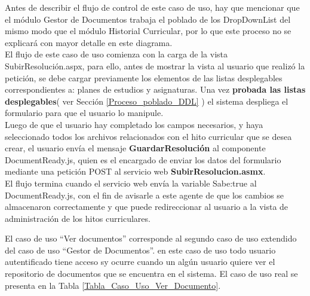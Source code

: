 	
	Antes de describir el flujo de control de este caso de uso, hay que mencionar que el módulo Gestor de Documentos trabaja el poblado de los DropDownList del mismo modo que el módulo Historial Curricular, por lo que este proceso no se explicará  con mayor detalle en este diagrama.\\
	
	El flujo de este caso de uso comienza con la carga de la vista SubirResolución.aspx, para ello, antes de mostrar la vista al usuario que realizó la petición, se debe cargar previamente los elementos de las listas  desplegables correspondientes a: planes de estudios y asignaturas. Una vez   \textbf{probada las   listas  desplegables}( ver Sección \ref{Proceso_poblado_DDL} ) el sistema despliega el formulario para que el usuario lo manipule.\\
	
	Luego de que el usuario hay completado los campos necesarios, y haya seleccionado todos los archivos relacionados con el hito curricular que se desea crear, el usuario envía el mensaje \textbf{GuardarResolución} al componente DocumentReady.js, quien es el encargado de  enviar los datos del formulario mediante una petición POST al servicio web \textbf{SubirResolucion.asmx}.\\
	
	El flujo termina cuando el servicio web envía la variable Sabe:true al DocumentReady.js, con el fin de avisarle a este agente de que los cambios se almacenaron correctamente y que puede redireccionar al usuario a la vista de administración de los hitos curriculares.

	
	

	
	
	
	El caso de uso ``Ver documentos'' corresponde al segundo caso de uso extendido del caso de uso  ``Gestor de Documentos''. en este caso de uso  todo usuario autentificado tiene acceso sy ocurre cuando un  algún usuario quiere ver el repositorio de documentos que se encuentra en el sistema. El caso de uso real se presenta en la Tabla  \ref{Tabla_Caso_Uso_Ver_Documento}.
	
